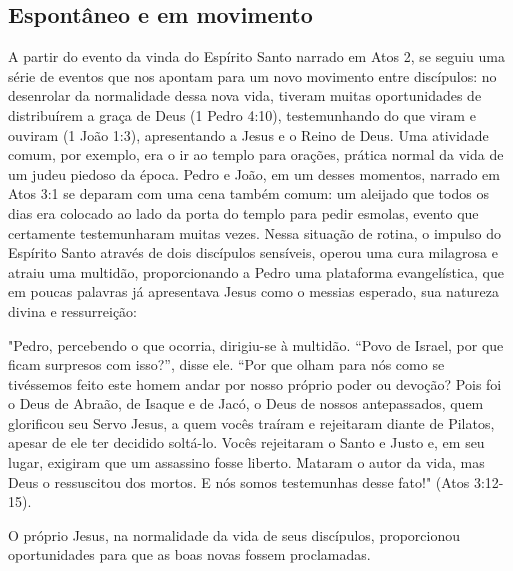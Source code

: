 \documentclass[12pt,openright,oneside,a4paper,
english,french,spanish,brazil]{abntex2}
\begin{document}

\subsection{Espontâneo e em movimento}

A partir do evento da vinda do Espírito Santo narrado em Atos 2, se seguiu uma série de eventos que nos apontam para um novo movimento entre discípulos: no desenrolar da normalidade dessa nova vida, tiveram muitas oportunidades de distribuírem a graça de Deus (1 Pedro 4:10), testemunhando do que viram e ouviram (1 João 1:3), apresentando a Jesus e o Reino de Deus. Uma atividade comum, por exemplo, era o ir ao templo para orações, prática normal da vida de um judeu piedoso da época. Pedro e João, em um desses momentos, narrado em Atos 3:1 se deparam com uma cena também comum: um aleijado que todos os dias era colocado ao lado da porta do templo para pedir esmolas, evento que certamente testemunharam muitas vezes. Nessa situação de rotina, o impulso do Espírito Santo através de dois discípulos sensíveis, operou uma cura milagrosa e atraiu uma multidão, proporcionando a Pedro uma plataforma evangelística, que em poucas palavras já apresentava Jesus como o messias esperado, sua natureza divina e ressurreição:

\begin{citacao}
	"Pedro, percebendo o que ocorria, dirigiu-se à multidão. “Povo de Israel, por que ficam surpresos com isso?”, disse ele. “Por que olham para nós como se tivéssemos feito este homem andar por nosso próprio poder ou devoção? Pois foi o Deus de Abraão, de Isaque e de Jacó, o Deus de nossos antepassados, quem glorificou seu Servo Jesus, a quem vocês traíram e rejeitaram diante de Pilatos,	apesar de ele ter decidido soltá-lo. Vocês rejeitaram o Santo e Justo e, em seu lugar, exigiram que um assassino fosse liberto. Mataram o autor da vida, mas Deus o ressuscitou dos mortos. E nós somos testemunhas desse fato!" (Atos 3:12-15).
\end{citacao}

O próprio Jesus, na normalidade da vida de seus discípulos, proporcionou oportunidades para que as boas novas fossem proclamadas.
\end{document}
